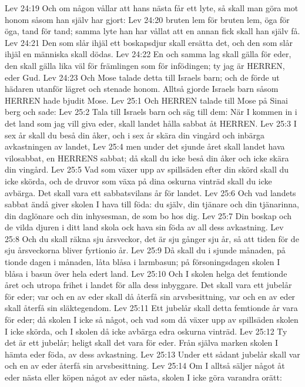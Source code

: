 Lev 24:19  Och om någon vållar att hans nästa får ett lyte, så skall man göra mot honom såsom han själv har gjort:
Lev 24:20  bruten lem för bruten lem, öga för öga, tand för tand; samma lyte han har vållat att en annan fick skall han själv få.
Lev 24:21  Den som slår ihjäl ett boskapsdjur skall ersätta det, och den som slår ihjäl en människa skall dödas.
Lev 24:22  En och samma lag skall gälla för eder, den skall gälla lika väl för främlingen som för infödingen; ty jag är HERREN, eder Gud.
Lev 24:23  Och Mose talade detta till Israels barn; och de förde ut hädaren utanför lägret och stenade honom. Alltså gjorde Israels barn såsom HERREN hade bjudit Mose.
Lev 25:1  Och HERREN talade till Mose på Sinai berg och sade:
Lev 25:2  Tala till Israels barn och säg till dem: När I kommen in i det land som jag vill giva eder, skall landet hålla sabbat åt HERREN.
Lev 25:3  I sex år skall du beså din åker, och i sex år skära din vingård och inbärga avkastningen av landet,
Lev 25:4  men under det sjunde året skall landet hava vilosabbat, en HERRENS sabbat; då skall du icke beså din åker och icke skära din vingård.
Lev 25:5  Vad som växer upp av spillsäden efter din skörd skall du icke skörda, och de druvor som växa på dina oskurna vinträd skall du icke avbärga. Det skall vara ett sabbatsvilans år för landet.
Lev 25:6  Och vad landets sabbat ändå giver skolen I hava till föda: du själv, din tjänare och din tjänarinna, din daglönare och din inhysesman, de som bo hos dig.
Lev 25:7  Din boskap och de vilda djuren i ditt land skola ock hava sin föda av all dess avkastning.
Lev 25:8  Och du skall räkna sju årsveckor, det är sju gånger sju år, så att tiden för de sju årsveckorna bliver fyrtionio år.
Lev 25:9  Då skall du i sjunde månaden, på tionde dagen i månaden, låta blåsa i larmbasun; på försoningsdagen skolen I blåsa i basun över hela edert land.
Lev 25:10  Och I skolen helga det femtionde året och utropa frihet i landet för alla dess inbyggare. Det skall vara ett jubelår för eder; var och en av eder skall då återfå sin arvsbesittning, var och en av eder skall återfå sin släktegendom.
Lev 25:11  Ett jubelår skall detta femtionde år vara för eder; då skolen I icke så något, och vad som då växer upp av spillsäden skolen I icke skörda, och I skolen då icke avbärga edra oskurna vinträd.
Lev 25:12  Ty det är ett jubelår; heligt skall det vara för eder. Från själva marken skolen I hämta eder föda, av dess avkastning.
Lev 25:13  Under ett sådant jubelår skall var och en av eder återfå sin arvsbesittning.
Lev 25:14  Om I alltså säljer något åt eder nästa eller köpen något av eder nästa, skolen I icke göra varandra orätt:
